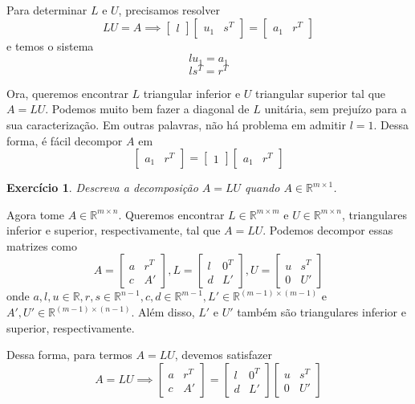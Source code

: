 \documentclass[]{article}
\newtheorem{exercicio}{Exercício}
\numberwithin{equation}{section}
\begin{document}
Para determinar $L$ e $U$, precisamos resolver
$$
LU = A \implies
\begin{bmatrix}
l
\end{bmatrix}
\begin{bmatrix}
u_1 & s^T
\end{bmatrix}
=
\begin{bmatrix}
a_1 & r^T
\end{bmatrix}
$$
e temos o sistema
$$
lu_1 = a_1
$$
$$
ls^T = r^T
$$

Ora, queremos encontrar $L$ triangular inferior e $U$ triangular superior tal que $A = LU$. Podemos muito bem fazer a diagonal de $L$ unitária, sem prejuízo para a sua caracterização. Em outras palavras, não há problema em admitir $l = 1$. Dessa forma, é fácil decompor $A$ em
$$
\begin{bmatrix}
a_1 & r^T
\end{bmatrix}
=
\begin{bmatrix}
1
\end{bmatrix}
\begin{bmatrix}
a_1 & r^T
\end{bmatrix}
$$

\begin{exercicio}
	Descreva a decomposição $A = LU$ quando $A \in \mathbb{R}^{m \times 1}$.
\end{exercicio}

Agora tome $A \in \mathbb{R}^{m \times n}$. Queremos encontrar $L \in \mathbb{R}^{m \times m}$ e $U \in \mathbb{R}^{m \times n}$, triangulares inferior e superior, respectivamente, tal que $A = LU$. Podemos decompor essas matrizes como
$$
A =
\begin{bmatrix}
a & r^T \\
c & A'
\end{bmatrix}
, L =
\begin{bmatrix}
l & 0^T \\
d & L'
\end{bmatrix}
, U =
\begin{bmatrix}
u & s^T \\
0 & U'
\end{bmatrix}
$$
onde $a, l, u \in \mathbb{R}, r, s \in \mathbb{R}^{n - 1}, c, d \in \mathbb{R}^{m - 1}, L' \in \mathbb{R}^{(m - 1) \times (m - 1)}$ e $A', U' \in \mathbb{R}^{(m - 1) \times (n - 1)}$. Além disso, $L'$ e $U'$ também são triangulares inferior e superior, respectivamente.

Dessa forma, para termos $A = LU$, devemos satisfazer
$$
A = LU \implies
\begin{bmatrix}
a & r^T \\
c & A'
\end{bmatrix}
=
\begin{bmatrix}
l & 0^T \\
d & L'
\end{bmatrix}
\begin{bmatrix}
u & s^T \\
0 & U'
\end{bmatrix}
$$
\end{document}
